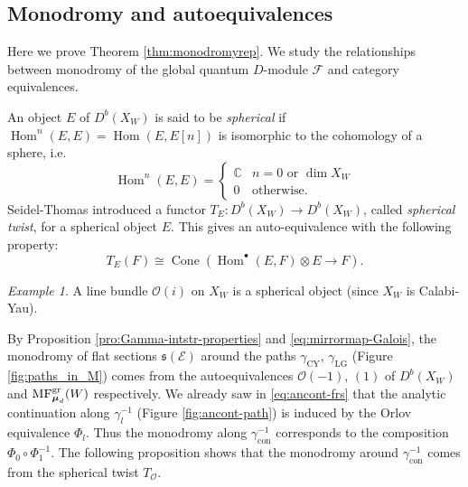 \documentclass[11pt]{amsart}
\theoremstyle{definition} %
\theoremstyle{remark} %
\newtheorem{exa}[thm]{Example}%
\newcommand{\CC}{\mathbb C}
\newcommand{\Hom}{\operatorname{Hom}}
\def\MFhom{\operatorname{{MF}}}
\newcommand{\bmu}{\boldsymbol{\mu}}
\newcommand{\cO}{\mathcal{O}}
\newcommand{\cE}{\mathcal{E}}
\newcommand{\cF}{\mathcal{F}}
\newcommand{\frs}{\mathfrak{s}}
\newcommand{\Cone}{\operatorname{Cone}}
\newcommand{\CY}{\operatorname{CY}}
\newcommand{\LG}{\operatorname{LG}}
\newcommand{\con}{\operatorname{con}}
\begin{document}
\subsection{Monodromy and autoequivalences} 
\label{subsec:monodromy}
Here we prove Theorem \ref{thm:monodromyrep}. 
We study the relationships between monodromy of 
the global quantum $D$-module $\cF$ 
and category equivalences.  

An object $E$ of $D^b(X_W)$ is said to be \emph{spherical} 
\cite[Definition 1.1]{Seidel-Thomas} if 
$\Hom^n(E,E) = \Hom(E,E[n])$ is isomorphic to the cohomology of 
a sphere, i.e.\ 
\[
\Hom^n(E, E) = \begin{cases} 
\CC & n = 0 \text{ or } \dim X_W \\ 
0 & \text{otherwise}.  
\end{cases} 
\]
Seidel-Thomas \cite{Seidel-Thomas} introduced a functor  
$T_E\colon D^b(X_W)\to D^b(X_W)$, called \emph{spherical twist}, 
for a spherical object $E$. 
This gives an auto-equivalence with the following property:  
\[
T_E(F) \cong \Cone( \Hom^\bullet(E,F)\otimes E \to F).  
\]
\begin{exa} 
A line bundle $\cO(i)$ on $X_W$ is a spherical object 
(since $X_W$ is Calabi-Yau). 
\end{exa} 

By Proposition \ref{pro:Gamma-intstr-properties} 
and \eqref{eq:mirrormap-Galois}, 
the monodromy of flat sections $\frs(\cE)$ 
around the paths $\gamma_{\CY}$, $\gamma_{\LG}$ 
(Figure \ref{fig:paths_in_M}) 
comes from the autoequivalences $\cO(-1)$, $(1)$ 
of $D^b(X_W)$ and $\MFhom^{\rm gr}_{\bmu_d}(W)$ 
respectively. 
We already saw in \eqref{eq:ancont-frs} that 
the analytic continuation along $\gamma_l^{-1}$ 
(Figure \ref{fig:ancont-path}) is 
induced by the Orlov equivalence $\Phi_l$. 
Thus the monodromy along $\gamma_{\con}^{-1}$ 
corresponds to the composition $\Phi_0 \circ \Phi_{1}^{-1}$. 
The following proposition shows that the monodromy 
around $\gamma_{\con}^{-1}$ comes from the spherical twist $T_\cO$. 
\end{document}
